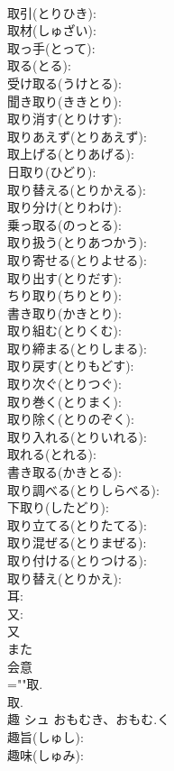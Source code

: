 \documentclass[8pt]{extreport}
\begin{document}
\begin{CJK}{UTF8}{min}
\\	取引(とりひき): 
\\	取材(しゅざい): 
\\	取っ手(とって): 
\\	取る(とる): 
\\	受け取る(うけとる): 
\\	聞き取り(ききとり): 
\\	取り消す(とりけす): 
\\	取りあえず(とりあえず): 
\\	取上げる(とりあげる): 
\\	日取り(ひどり): 
\\	取り替える(とりかえる): 
\\	取り分け(とりわけ): 
\\	乗っ取る(のっとる): 
\\	取り扱う(とりあつかう): 
\\	取り寄せる(とりよせる): 
\\	取り出す(とりだす): 
\\	ちり取り(ちりとり): 
\\	書き取り(かきとり): 
\\	取り組む(とりくむ): 
\\	取り締まる(とりしまる): 
\\	取り戻す(とりもどす): 
\\	取り次ぐ(とりつぐ): 
\\	取り巻く(とりまく): 
\\	取り除く(とりのぞく): 
\\	取り入れる(とりいれる): 
\\	取れる(とれる): 
\\	書き取る(かきとる): 
\\	取り調べる(とりしらべる): 
\\	下取り(したどり): 
\\	取り立てる(とりたてる): 
\\	取り混ぜる(とりまぜる): 
\\	取り付ける(とりつける): 
\\	取り替え(とりかえ): 
\\	耳: 
\\	又: 
\\	又	
\\	また	
\\	会意 
\\	=""取.
\\	取.
\\	趣	シュ	おもむき、おもむ.く		
\\	趣旨(しゅし): 
\\	趣味(しゅみ): 

\end{CJK}
\end{document}
